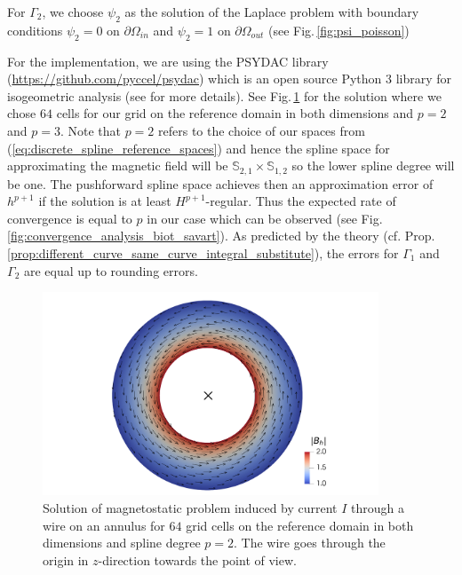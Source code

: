 \documentclass[../master_thesis.tex]{subfiles}
\begin{document}
For $\Gamma_2$, we choose $\psi_2$ as the solution of the Laplace problem with boundary conditions 
$\psi_2 = 0$ on $\partial \Omega_{in}$ and $\psi_2 = 1$ on $\partial \Omega_{out}$ 
(see Fig.\,\ref{fig:psi_poisson})

For the implementation, we are using the PSYDAC library (\url{https://github.com/pyccel/psydac}) 
which is an open source 
Python 3 library 
for isogeometric analysis (see \cite{psydac_paper} for more details).
See Fig.\,\ref{fig:biot_savart_annulus_plot} for the solution where 
we chose $64$ cells for our grid on the reference domain in both dimensions and $p=2$ and $p=3$. 
Note that $p=2$ refers to the choice of our spaces from
(\ref{eq:discrete_spline_reference_spaces}) and hence the spline space for approximating 
the magnetic field will be $\mathbb{S}_{2,1} \times \mathbb{S}_{1,2}$ 
so the lower spline degree will be one. 
The pushforward spline space achieves then an approximation error 
of $h^{p+1}$ \cite[Ch.4, (4.48)]{splines_and_pdes} if the solution is at least 
$H^{p+1}$-regular.
Thus the expected rate of 
convergence is equal to $p$ in our case which can be observed 
(see Fig.\,\ref{fig:convergence_analysis_biot_savart}). As predicted by the theory
(cf. Prop.\,\ref{prop:different_curve_same_curve_integral_substitute}),
the errors for $\Gamma_1$ and $\Gamma_2$ are equal up to rounding errors.

\begin{figure}
    \centering
    \includegraphics[width=10cm] {plot_files/biot_savart_annulus/B_h_with_cross.png}
    \caption{Solution of magnetostatic problem induced by current $I$ through a wire on an annulus for 
    $64$ grid cells on the reference domain in both dimensions and spline degree $p=2$. The wire goes 
    through the origin in $z$-direction towards the point of view.
    }
    \label{fig:biot_savart_annulus_plot}
\end{figure}
\end{document}
